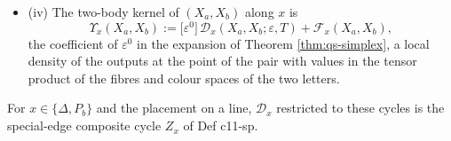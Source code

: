 \begin{definition}
\begin{itemize}
\begin{equation}
\label{eq:qs-finitesp}
\end{equation}
with $\{-,-\}_{H^m}$ the bracket built from $(H^m\otimes1)K_0$ in place of $K_0$ (eq c10-finitesp).
\item (iv) The two-body kernel of $(X_a,X_b)$ along $x$ is
\begin{equation}
\Upsilon_x(X_a,X_b):=\big[\varepsilon^0\big]\,\mathcal D_x(X_a,X_b;\varepsilon,T)+\mathcal F_x(X_a,X_b),
\label{eq:qs-kernel}
\end{equation}
the coefficient of $\varepsilon^0$ in the expansion of Theorem \ref{thm:qs-simplex}, a local density of the outputs at the point of the pair with values in the tensor product of the fibres and colour spaces of the two letters.
\end{itemize}
For $x\in\{\Delta,P_b\}$ and the placement on a line, $\mathcal D_x$ restricted to these cycles is the special-edge composite cycle $Z_x$ of Def c11-sp.
\end{definition}
